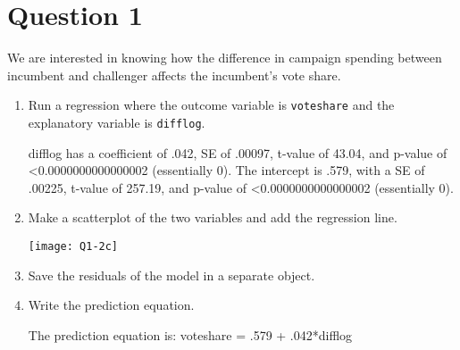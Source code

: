 \documentclass[12pt,letterpaper]{article}
\begin{document}
\section*{Question 1} %
\vspace{.25cm}
\noindent We are interested in knowing how the difference in campaign spending between incumbent and challenger affects the incumbent's vote share. 
	\begin{enumerate}
		\item Run a regression where the outcome variable is \texttt{voteshare} and the explanatory variable is \texttt{difflog}.	\vspace{.5cm}

		\vspace{.25cm}

		\vspace{.25cm}
difflog has a coefficient of .042, SE of .00097, t-value of 43.04, and p-value of \textless0.0000000000000002 (essentially 0).
The intercept is .579, with a SE of .00225, t-value of 257.19, and p-value of \textless0.0000000000000002 (essentially 0).
		\vspace{1cm}
		\item Make a scatterplot of the two variables and add the regression line.
		\vspace{.5cm}

		\vspace{.25cm}
\texttt{[image: Q1-2c]}		
		\vspace{1cm}
		\item Save the residuals of the model in a separate object.
		\vspace{.5cm}
	
		\vspace{1cm}		
		\item Write the prediction equation.
		\vspace{.5cm}

		\vspace{.25cm}
The prediction equation is: voteshare = .579 + .042*difflog
		\vspace{1cm}		
		
	\end{enumerate}
	
\newpage
\end{document}

